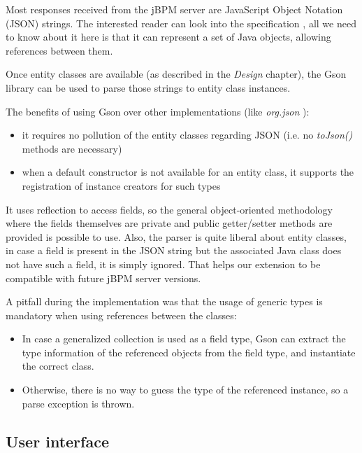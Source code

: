 Most responses received from the jBPM server are JavaScript Object Notation
(JSON) strings. The interested reader can look into the
specification \cite{json}, all we need to know about it here is that it can
represent a set of Java objects, allowing references between them.

Once entity classes are available (as described in the \emph{Design} chapter),
the Gson library \cite{gson} can be used to parse those strings to entity class
instances.

The benefits of using Gson over other implementations (like
\emph{org.json} \cite{org-json}):

\begin{itemize}
\item it requires no pollution of the entity classes regarding JSON (i.e. no \emph{toJson()} methods are necessary)
\item when a default constructor is not available for an entity class, it supports the registration of instance creators for such types
\end{itemize}

It uses reflection to access fields, so the general object-oriented methodology
where the fields themselves are private and public getter/setter methods are
provided is possible to use. Also, the parser is quite liberal about entity
classes, in case a field is present in the JSON string but the associated Java
class does not have such a field, it is simply ignored. That helps our
extension to be compatible with future jBPM server versions.

A pitfall during the implementation was that the usage of generic types is
mandatory when using references between the classes:

\begin{itemize}
\item In case a generalized collection is used as a field type, Gson can extract the type information of the referenced objects from the field type, and instantiate the correct class.
\item Otherwise, there is no way to guess the type of the referenced instance, so a parse exception is thrown.
\end{itemize}

\subsection{User interface}


